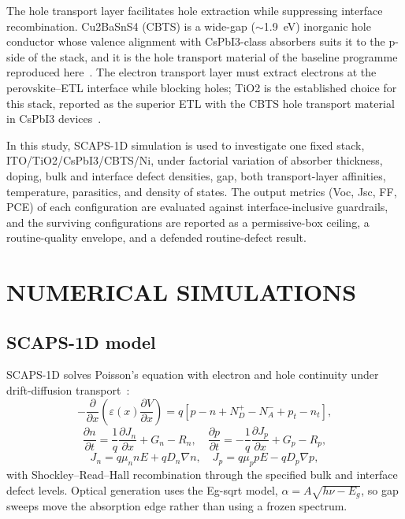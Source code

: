 \documentclass[11pt,a4paper]{article}
\begin{document}
The hole transport layer facilitates hole extraction while suppressing interface recombination. Cu2BaSnS4 (CBTS) is a wide-gap ($\sim$1.9~eV) inorganic hole conductor whose valence alignment with CsPbI3-class absorbers suits it to the p-side of the stack, and it is the hole transport material of the baseline programme reproduced here~\cite{Hossain2022,Hossain2023}. The electron transport layer must extract electrons at the perovskite--ETL interface while blocking holes; TiO2 is the established choice for this stack, reported as the superior ETL with the CBTS hole transport material in CsPbI3 devices~\cite{Hossain2023}.

In this study, SCAPS-1D simulation is used to investigate one fixed stack, ITO/TiO2/CsPbI3/CBTS/Ni, under factorial variation of absorber thickness, doping, bulk and interface defect densities, gap, both transport-layer affinities, temperature, parasitics, and density of states. The output metrics (Voc, Jsc, FF, PCE) of each configuration are evaluated against interface-inclusive guardrails, and the surviving configurations are reported as a permissive-box ceiling, a routine-quality envelope, and a defended routine-defect result.

\section{NUMERICAL SIMULATIONS}

\subsection{SCAPS-1D model}

SCAPS-1D solves Poisson's equation with electron and hole continuity under drift-diffusion transport~\cite{Burgelman2000,Khattak2019,BurgelmanSCAPS}:
\begin{equation}
-\frac{\partial}{\partial x}\left(\varepsilon(x)\frac{\partial V}{\partial x}\right) = q[p-n+N_D^+-N_A^-+p_t-n_t],
\end{equation}
\begin{equation}
\frac{\partial n}{\partial t}=\frac{1}{q}\frac{\partial J_n}{\partial x}+G_n-R_n,\quad
\frac{\partial p}{\partial t}=-\frac{1}{q}\frac{\partial J_p}{\partial x}+G_p-R_p,
\end{equation}
\begin{equation}
J_n=q\mu_nnE+qD_n\nabla n,\quad
J_p=q\mu_ppE-qD_p\nabla p,
\end{equation}
with Shockley--Read--Hall recombination through the specified bulk and interface defect levels. Optical generation uses the Eg-sqrt model, $\alpha=A\sqrt{h\nu-E_g}$, so gap sweeps move the absorption edge rather than using a frozen spectrum.
\end{document}
